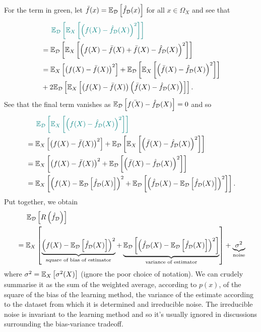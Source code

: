\documentclass[11pt]{article}
\begin{document}
For the term in green, let $\bar{f}(x)=\mathbb{E}_{\mathcal{D}}\left[\hat{f}_{\mathcal{D}}(x)\right]$ for all $x\in\Omega_X$ and see that
\begin{align*}
    &\hspace{14.52pt}
    \textcolor{c11}{\E_{\D}\l[\E_X\l[\l(f(X)-\hat{f}_{\D}(X)\r)^2\r]\r]}\\
    &=
    \E_{\D}\l[\E_X\l[\l(f(X)-\bar{f}(X)+\bar{f}(X)-\hat{f}_{\D}(X)\r)^2\r]\r]\\
    &=
    \E_X\l[\l(f(X)-\bar{f}(X)\r)^2\r]+\E_{\D}\l[\E_X\l[\l(\bar{f}(X)-\hat{f}_{\D}(X)\r)^2\r]\r]\\
    &+
    2\E_{\D}\l[\E_X\l[\l(f(X)-\bar{f}(X)\r)\l(\bar{f}(X)-\hat{f}_{\D}(X)\r)\r]\r].
\end{align*}
See that the final term vanishes as $\mathbb{E}_{\mathcal{D}}\left[\bar{f(X)}-\hat{f}_{\mathcal{D}}(X)\right]=0$ and so
\begin{align*}
    &\hspace{14.52pt}
    \textcolor{c11}{\E_{\D}\l[\E_X\l[\l(f(X)-\hat{f}_{\D}(X)\r)^2\r]\r]}\\
    &=
    \E_X\l[\l(f(X)-\bar{f}(X)\r)^2\r]+\E_{\D}\l[\E_X\l[\l(\bar{f}(X)-\hat{f}_{\D}(X)\r)^2\r]\r]\\
    &=
    \E_X\l[\l(f(X)-\bar{f}(X)\r)^2+\E_{\D}\l[\l(\bar{f}(X)-\hat{f}_{\D}(X)\r)^2\r]\r]\\
    &=
    \E_X\l[\l(f(X)-\E_{\D}\l[\hat{f}_{\D}(X)\r]\r)^2+\E_{\D}\l[\l(\hat{f}_{\D}(X)-\E_{\D}\l[\hat{f}_{\D}(X)\r]\r)^2\r]\r].
\end{align*}
Put together, we obtain
\begin{align*}
    &\hspace{14.52pt}
    \mathbb{E}_{\mathcal{D}}\left[R\left(\hat{f}_{\mathcal{D}}\right)\right]\\
    &=
    \mathbb{E}_X\left[\underbrace{\left(f(X)-\mathbb{E}_{\mathcal{D}}\left[\hat{f}_{\mathcal{D}}(X)\right]\right)^2}_{\text{square of bias of estimator}}+\underbrace{\mathbb{E}_{\mathcal{D}}\left[\left(\hat{f}_{\mathcal{D}}(X)-\mathbb{E}_{\mathcal{D}}\left[\hat{f}_{\mathcal{D}}(X)\right]\right)^2\right]}_{\text{variance of estimator}}\right]+\underbrace{\sigma^2}_{\text{noise}}
\end{align*}
where $\sigma^2=\mathbb{E}_X\left[\sigma^2(X)\right]$ (ignore the poor choice of notation). We can crudely summarise it as the sum of the weighted average, according to $p(x)$, of the square of the bias of the learning method, the variance of the estimate according to the dataset from which it is determined and irreducible noise. The irreducible noise is invariant to the learning method and so it's usually ignored in discussions surrounding the bias-variance tradeoff.
\end{document}
